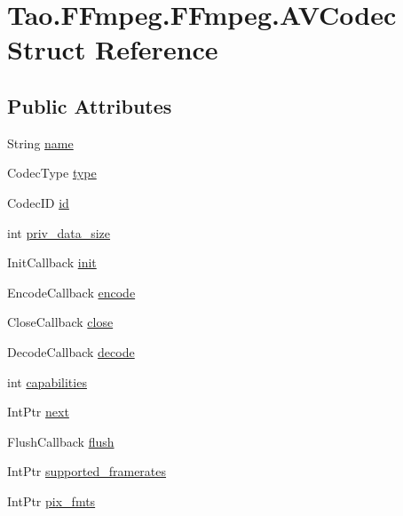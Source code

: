 \hypertarget{struct_tao_1_1_f_fmpeg_1_1_f_fmpeg_1_1_a_v_codec}{
\section{Tao.FFmpeg.FFmpeg.AVCodec Struct Reference}
\label{struct_tao_1_1_f_fmpeg_1_1_f_fmpeg_1_1_a_v_codec}
}
\subsection*{Public Attributes}
\begin{DoxyCompactItemize}
\item 
String \hyperlink{struct_tao_1_1_f_fmpeg_1_1_f_fmpeg_1_1_a_v_codec_a3eb995e29b4a0c4af7d6378c7bca5da1}{name}
\item 
CodecType \hyperlink{struct_tao_1_1_f_fmpeg_1_1_f_fmpeg_1_1_a_v_codec_af704fbe01412cd798eba2c7abb44d347}{type}
\item 
CodecID \hyperlink{struct_tao_1_1_f_fmpeg_1_1_f_fmpeg_1_1_a_v_codec_a3be413635fe401fdcbe143e27e673f5d}{id}
\item 
int \hyperlink{struct_tao_1_1_f_fmpeg_1_1_f_fmpeg_1_1_a_v_codec_acd425f2226cd121343ef4e00192726e9}{priv\_\-data\_\-size}
\item 
InitCallback \hyperlink{struct_tao_1_1_f_fmpeg_1_1_f_fmpeg_1_1_a_v_codec_ace9bb7a5a8955799b1d9d189d1f75999}{init}
\item 
EncodeCallback \hyperlink{struct_tao_1_1_f_fmpeg_1_1_f_fmpeg_1_1_a_v_codec_a43ff4d62441c021514988adf3d5c8e8f}{encode}
\item 
CloseCallback \hyperlink{struct_tao_1_1_f_fmpeg_1_1_f_fmpeg_1_1_a_v_codec_a1f55fd487e07c8c286f00d9b709a7b80}{close}
\item 
DecodeCallback \hyperlink{struct_tao_1_1_f_fmpeg_1_1_f_fmpeg_1_1_a_v_codec_aa361a2b8a1934cc3e96cd3f989e873d0}{decode}
\item 
int \hyperlink{struct_tao_1_1_f_fmpeg_1_1_f_fmpeg_1_1_a_v_codec_a42926fb934e84565fdc5eba55b0291ef}{capabilities}
\item 
IntPtr \hyperlink{struct_tao_1_1_f_fmpeg_1_1_f_fmpeg_1_1_a_v_codec_a3bcd75e446ee7e0ee4434593165a694b}{next}
\item 
FlushCallback \hyperlink{struct_tao_1_1_f_fmpeg_1_1_f_fmpeg_1_1_a_v_codec_a5758f9c6023bcce419525b09958d9869}{flush}
\item 
IntPtr \hyperlink{struct_tao_1_1_f_fmpeg_1_1_f_fmpeg_1_1_a_v_codec_acc8e94ca5dfc811afe55158be3fafbd7}{supported\_\-framerates}
\item 
IntPtr \hyperlink{struct_tao_1_1_f_fmpeg_1_1_f_fmpeg_1_1_a_v_codec_ace69e7241cca98f5073e1d5aaac10bc4}{pix\_\-fmts}
\end{DoxyCompactItemize}


